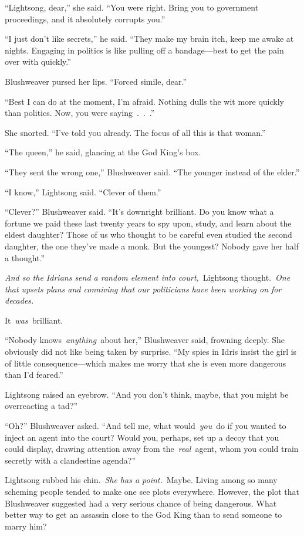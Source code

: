 “Lightsong, dear,” she said. “You were right. Bring you to government proceedings, and it absolutely corrupts you.”

“I just don’t like secrets,” he said. “They make my brain itch, keep me awake at nights. Engaging in politics is like pulling off a bandage—best to get the pain over with quickly.”

Blushweaver pursed her lips. “Forced simile, dear.”

“Best I can do at the moment, I’m afraid. Nothing dulls the wit more quickly than politics. Now, you were saying~.~.~.”

She snorted. “I’ve told you already. The focus of all this is that woman.”

“The queen,” he said, glancing at the God King’s box.

“They sent the wrong one,” Blushweaver said. “The younger instead of the elder.”

“I know,” Lightsong said. “Clever of them.”

“Clever?” Blushweaver said. “It’s downright brilliant. Do you know what a fortune we paid these last twenty years to spy upon, study, and learn about the eldest daughter? Those of us who thought to be careful even studied the second daughter, the one they’ve made a monk. But the youngest? Nobody gave her half a thought.”

\textit{And so the Idrians send a random element into court,}~Lightsong thought.~\textit{One that upsets plans and conniving that our politicians have been working on for decades.}

It~\textit{was}~brilliant.

“Nobody knows~\textit{anything}~about her,” Blushweaver said, frowning deeply. She obviously did not like being taken by surprise. “My spies in Idris insist the girl is of little consequence—which makes me worry that she is even more dangerous than I’d feared.”

Lightsong raised an eyebrow. “And you don’t think, maybe, that you might be overreacting a tad?”

“Oh?” Blushweaver asked. “And tell me, what would~\textit{you}~do if you wanted to inject an agent into the court? Would you, perhaps, set up a decoy that you could display, drawing attention away from the~\textit{real}~agent, whom you could train secretly with a clandestine agenda?”

Lightsong rubbed his chin.~\textit{She has a point.}~Maybe. Living among so many scheming people tended to make one see plots everywhere. However, the plot that Blushweaver suggested had a very serious chance of being dangerous. What better way to get an assassin close to the God King than to send someone to marry him?

